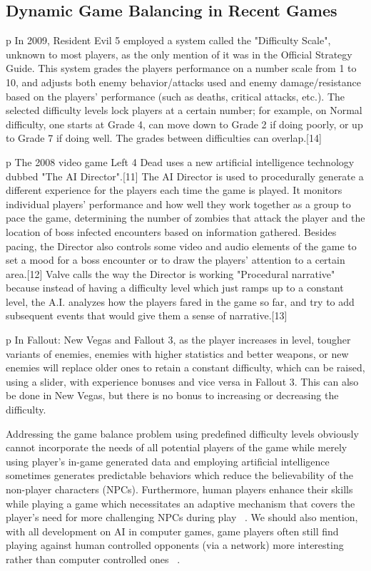 \subsection{Dynamic Game Balancing in Recent Games}
p In 2009, Resident Evil 5 employed a system called the "Difficulty Scale", unknown to most players, as the only mention of it was in the Official Strategy Guide. This system grades the players performance on a number scale from 1 to 10, and adjusts both enemy behavior/attacks used and enemy damage/resistance based on the players' performance (such as deaths, critical attacks, etc.). The selected difficulty levels lock players at a certain number; for example, on Normal difficulty, one starts at Grade 4, can move down to Grade 2 if doing poorly, or up to Grade 7 if doing well. The grades between difficulties can overlap.[14]

p The 2008 video game Left 4 Dead uses a new artificial intelligence technology dubbed "The AI Director".[11] The AI Director is used to procedurally generate a different experience for the players each time the game is played. It monitors individual players' performance and how well they work together as a group to pace the game, determining the number of zombies that attack the player and the location of boss infected encounters based on information gathered. Besides pacing, the Director also controls some video and audio elements of the game to set a mood for a boss encounter or to draw the players' attention to a certain area.[12] Valve calls the way the Director is working "Procedural narrative" because instead of having a difficulty level which just ramps up to a constant level, the A.I. analyzes how the players fared in the game so far, and try to add subsequent events that would give them a sense of narrative.[13]

p In Fallout: New Vegas and Fallout 3, as the player increases in level, tougher variants of enemies, enemies with higher statistics and better weapons, or new enemies will replace older ones to retain a constant difficulty, which can be raised, using a slider, with experience bonuses and vice versa in Fallout 3. This can also be done in New Vegas, but there is no bonus to increasing or decreasing the difficulty.

Addressing the game balance problem using predefined difficulty levels obviously cannot incorporate the needs of all potential players of the game while merely using player's in-game generated data and employing artificial intelligence sometimes generates predictable behaviors which reduce the believability of the non-player characters (NPCs). Furthermore, human players enhance their skills while playing a game which necessitates an adaptive mechanism that covers the player's need for more challenging NPCs during play ~\cite{olesen2008real}. We should also mention, with all development on AI in computer games, game players often still find playing against human controlled opponents (via a network) more interesting rather than computer controlled ones ~\cite{weibel2008playing}.

